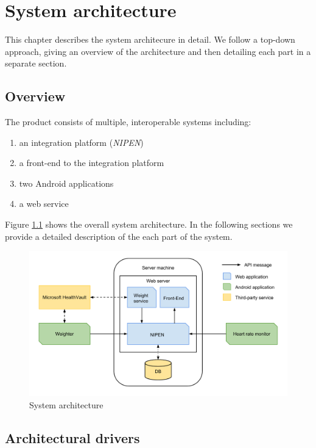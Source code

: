 \chapter{System architecture}
\label{ch:architecture}


This chapter describes the system architecure in detail.
We follow a top-down approach, giving an overview of the architecture and then detailing each part in a separate section.

\section{Overview}

The product consists of multiple, interoperable systems including:
\begin{enumerate}[1.]
	\item an integration platform (\textit{NIPEN})
	\item a front-end to the integration platform
	\item two Android applications
	\item a web service
\end{enumerate}

Figure \ref{figure:architecture} shows the overall system architecture.
In the following sections we provide a detailed description of the each part of the system.

\begin{figure}[h]
\centering
\includegraphics[scale=0.5]{../Figures/architecture.pdf}
\caption{System architecture}
\label{figure:architecture}
\end{figure}

\section{Architectural drivers}

